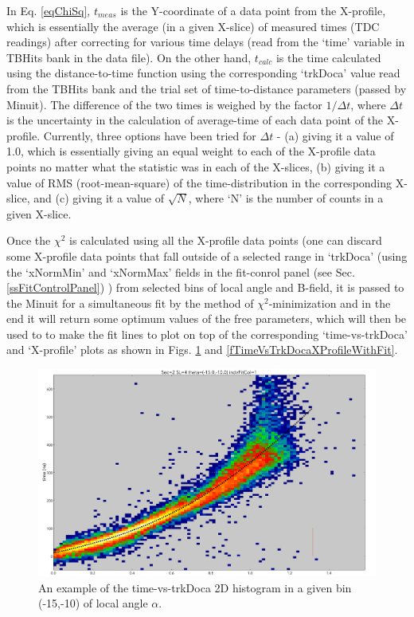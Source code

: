 \documentclass[12pt,epsfig]{article}
\begin{document}
In Eq. \ref{eqChiSq}, $t_{meas}$ is the Y-coordinate of a data point from the X-profile, which is essentially the average (in a given X-slice) of measured times (TDC readings) after correcting for various time delays (read from the `time' variable in TBHits bank in the data file). On the other hand, $t_{calc}$ is the time calculated using the distance-to-time function using the corresponding `trkDoca'  value read from the TBHits bank and the trial set of time-to-distance parameters (passed by Minuit). The difference of the two times is weighed by the factor $1/\Delta t$, where $\Delta t$ is the uncertainty in the calculation of average-time of each data point of the X-profile. Currently, three options have been tried for $\Delta t$ - (a) giving it a value of 1.0, which is essentially giving an equal weight to each of the X-profile data points no matter what the statistic was in each of the X-slices, (b) giving it a value of RMS (root-mean-square) of the time-distribution in the corresponding X-slice, and (c) giving it a value of $\sqrt{N}$, where `N' is the number of counts in a given X-slice.

Once the $\chi^2$ is calculated using all the X-profile data points (one can discard some X-profile data points that fall outside of a selected range in `trkDoca' (using the `xNormMin' and `xNormMax' fields in the fit-conrol panel (see Sec. \ref{ssFitControlPanel}) ) from selected bins of local angle and B-field, it is passed to the Minuit for a simultaneous fit by the method of $\chi^2$-minimization and in the end it will return some optimum values of the free parameters, which will then be used to to make the fit lines to plot on top of the corresponding `time-vs-trkDoca' and `X-profile' plots as shown in Figs. \ref{fTimeVsTrkDocaWithFit} and \ref{fTimeVsTrkDocaXProfileWithFit}.
\begin{figure}
    \centering
    \includegraphics[width=1.0\textwidth]{Figures/time_vs_trkDocaExample_Sec2_SL4_th_m15_m10withFit.png}
    \caption{An example of the time-vs-trkDoca 2D histogram in a given bin (-15,-10) of local angle $\alpha$.}
    \label{fTimeVsTrkDocaWithFit}
\end{figure}
\end{document}
